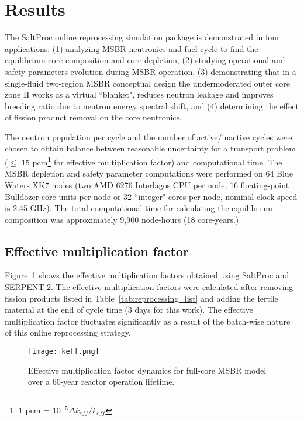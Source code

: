\section{Results}
The SaltProc online reprocessing simulation package is demonstrated in four 
applications: (1) analyzing  \gls{MSBR} neutronics and fuel cycle to find the 
equilibrium core composition and core depletion, (2) studying operational and 
safety parameters evolution during \gls{MSBR} operation, (3) demonstrating that 
in a single-fluid two-region \gls{MSBR} conceptual design the undermoderated 
outer core zone II works as a virtual ``blanket", reduces neutron leakage and 
improves breeding ratio due to neutron energy spectral shift, and (4) 
determining the effect of fission product removal on the core neutronics.

The neutron population per cycle and the number of active/inactive cycles were 
chosen to obtain balance between reasonable uncertainty for a transport problem 
($\leq$ 15 pcm\footnote{ 1 pcm = 10$^{-5}\Delta k_{eff}/k_{eff}$} for effective 
multiplication factor) and computational time. The \gls{MSBR} depletion and 
safety parameter computations were performed on 64 Blue Waters XK7 nodes (two 
AMD 6276 Interlagos CPU per node, 16 floating-point Bulldozer core units per 
node or 32 ``integer" cores per node, nominal clock speed is 2.45 GHz). The 
total computational time for calculating the equilibrium composition was 
approximately 9,900 node-hours (18 core-years.)

\subsection{Effective multiplication factor}
Figure~\ref{fig:keff} shows the effective multiplication factors 
obtained using SaltProc and SERPENT 2. The effective multiplication factors were 
calculated after removing fission products listed in 
Table~\ref{tab:reprocessing_list} and adding the fertile material at the end of 
cycle time (3 days for this work). The effective multiplication 
factor fluctuates significantly as a result of the batch-wise nature of this 
online reprocessing strategy. 

\begin{figure}[ht!] 
  \centering
  \texttt{[image: keff.png]}
  \caption{Effective multiplication factor dynamics for full-core \gls{MSBR} 
  model over a 60-year reactor operation lifetime.}
  \label{fig:keff}
\end{figure}

